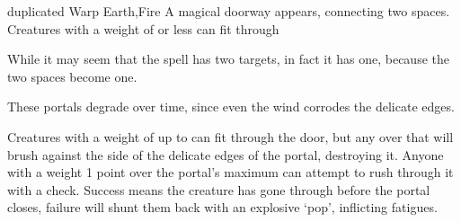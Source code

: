   {duplicated}%
  {Warp}%
  {Earth,Fire}%
  {}%
  {A magical doorway appears, connecting two spaces.
  Creatures with a \gls{weight} of  or less can fit through}%
  {While it may seem that the spell has two targets, in fact it has one, because the two spaces become one.

    These portals degrade over time, since even the wind corrodes the delicate edges.

    Creatures with a \gls{weight} of up to  can fit through the door, but any over that will brush against the side of the delicate edges of the portal, destroying it.
    Anyone with a \gls{weight} 1 point over the portal's maximum can attempt to rush through it with a  check.
    Success means the creature has gone through before the portal closes, failure will shunt them back with an explosive `pop', inflicting  \glspl{fatigue}.
  }
